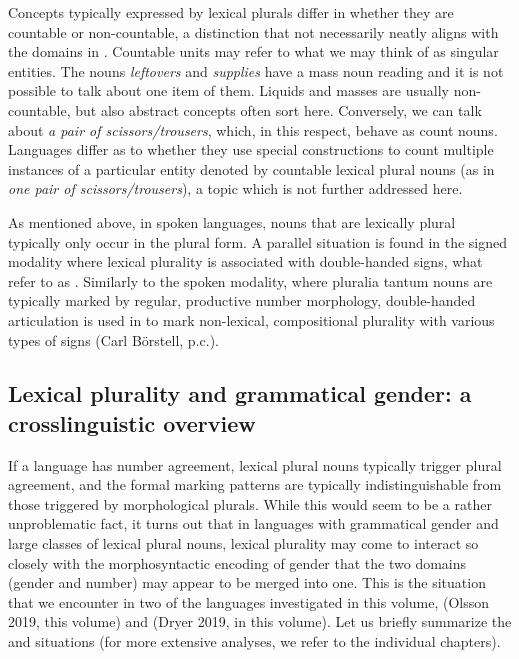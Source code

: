 \documentclass[output=collectionpaper]{langsci/langscibook}
\begin{document}
Concepts typically expressed by lexical plurals differ in whether they are countable or non-countable, a distinction that not necessarily neatly aligns with the domains in . Countable units may refer to what we may think of as singular entities. The  nouns \textit{leftovers} and \textit{supplies} have a mass noun reading and it is not possible to talk about one item of them. Liquids and masses are usually non-countable, but also abstract concepts often sort here. Conversely, we can talk about \textit{a pair of scissors/trousers}, which, in this respect, behave as count nouns. Languages differ as to whether they use special constructions to count multiple instances of a particular entity denoted by countable lexical plural nouns (as in  \textit{one pair of scissors/trousers}), a topic which is not further addressed here.

As mentioned above, in spoken languages, nouns that are lexically plural typically only occur in the plural form. A parallel situation is found in the signed modality where lexical plurality is associated with double-handed signs, what \cite{Boerstell2017} refer to as . Similarly to the spoken modality, where pluralia tantum nouns are typically marked by regular, productive number morphology, double-handed articulation is used in  to mark non-lexical, compositional plurality with various types of signs (Carl Börstell, p.c.).

\subsection{Lexical plurality and grammatical gender: a crosslinguistic overview}\label{sec:WDG:9.2}

If a language has number agreement, lexical plural nouns typically trigger plural agreement, and the formal marking patterns are typically indistinguishable from those triggered by morphological plurals. While this would seem to be a rather unproblematic fact, it turns out that in languages with grammatical gender and large classes of lexical plural nouns, lexical plurality may come to interact so closely with the morphosyntactic encoding of gender that the two domains (gender and number) may appear to be merged into one. This is the situation that we encounter in two of the  languages investigated in this volume,  (Olsson 2019, this volume) and  (Dryer 2019, in this volume). Let us briefly summarize the  and  situations (for more extensive analyses, we refer to the individual chapters).
\end{document}
